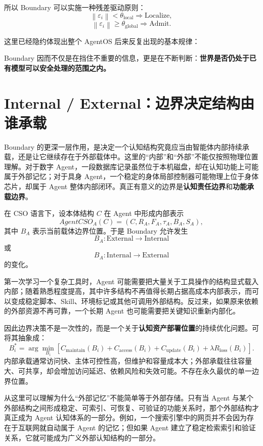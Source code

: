 所以 Boundary 可以实施一种残差驱动原则：
\[
\left\|
\varepsilon_i
\right\|
<
\theta_{\mathrm{local}}
\Rightarrow
\mathrm{Localize},
\]
\[
\left\|
\varepsilon_i
\right\|
\geq
\theta_{\mathrm{global}}
\Rightarrow
\mathrm{Admit}.
\]

这里已经隐约体现出整个 AgentOS 后来反复出现的基本规律：
\begin{statementbox}
\centering
{}
\end{statementbox}

Boundary 因而不仅是在挡住不重要的信息，更是在不断判断：\textbf{世界是否仍处于已有模型可以安全处理的范围之内。}


\section{Internal / External：边界决定结构由谁承载}

Boundary 的更深一层作用，是决定一个认知结构究竟应当由智能体内部持续承载，还是让它继续存在于外部载体中。这里的“内部”和“外部”不能仅按照物理位置理解。对于数字 Agent，一段数据库记录虽然位于本机磁盘，却在认知功能上可能属于外部记忆；对于具身 Agent，一个稳定的身体局部控制器可能物理上位于身体芯片，却属于 Agent 整体内部闭环。真正有意义的边界是\textbf{认知责任边界}和\textbf{功能承载边界}。

在 CSO 语言下，设本体结构 $C$ 在 Agent 中形成内部表示
\[
AgentCSO_A(C)
=
(C,R_A,F_A,\tau_A,B_A,S_A),
\]
其中 $B_A$ 表示当前载体边界位置。于是 Boundary 允许发生
\[
B_A:
\mathrm{External}
\rightarrow
\mathrm{Internal}
\]
或
\[
B_A:
\mathrm{Internal}
\rightarrow
\mathrm{External}
\]
的变化。

第一次学习一个复杂工具时，Agent 可能需要把大量关于工具操作的结构显式载入内部；随着熟悉程度提高，其中许多结构不再值得长期占据高成本内部表示，而可以变成稳定脚本、Skill、环境标记或其他可调用外部结构。反过来，如果原来依赖的外部资源不再可靠，一个长期 Agent 也可能需要把关键知识重新内部化。

因此边界决策不是一次性的，而是一个关于\textbf{认知资产部署位置}的持续优化问题。可将其抽象成：
\[
B_i^{*}
=
\arg\min_{B_i}
\left[
C_{\mathrm{maintain}}(B_i)
+
C_{\mathrm{access}}(B_i)
+
C_{\mathrm{update}}(B_i)
+
\lambda
R_{\mathrm{loss}}(B_i)
\right].
\]
内部承载通常访问快、主体可控性高，但维护和容量成本大；外部承载往往容量大、可共享，却会增加访问延迟、依赖风险和失效可能。不存在永久最优的单一边界位置。

从这里可以理解为什么“外部记忆”不能简单等于外部存储。只有当 Agent 与某个外部结构之间形成稳定、可索引、可恢复、可验证的功能关系时，那个外部结构才真正成为 Agent 认知体系的一部分。例如，一个搜索引擎中的网页并不会因为存在于互联网就自动属于 Agent 的记忆；但如果 Agent 建立了稳定检索索引和验证关系，它就可能成为广义外部认知结构的一部分。

